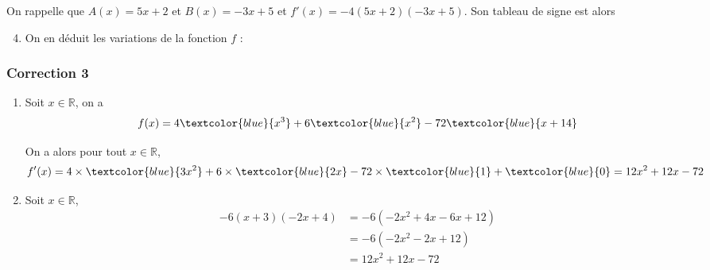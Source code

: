 \documentclass[15pt, mathserif]{beamer}
\newcommand{\R}{\mathbb{R}}			%
\begin{document}
\begin{frame}On rappelle que $A(x) = 5x+2$ et $B(x) = -3x+5$ et $f'(x) = -4(5x+2)(-3x+5)$. Son tableau de signe est alors 

\medskip \hfil
{}

 \begin{enumerate} 
 \setcounter{enumi}{3} 
 	 \item On en déduit les variations de la fonction $f$ : 

  \medskip \hfil
{}

 \end{enumerate} 
 
\end{frame}


\begin{frame}
\vspace{-10mm}
	\frametitle{Correction 3}
\begin{enumerate} 
 	 \item Soit $x \in \R$, on a $$f(x)=4\textcolor{blue}{x^3}+6\textcolor{blue}{x^2}-72\textcolor{blue}{x+14}$$
 
 On a alors pour tout $x \in  \R$, $$f'(x)= 4\times \textcolor{blue}{3x^2} +6\times \textcolor{blue}{2x}-72\times \textcolor{blue}{1}+\textcolor{blue}{0}=12x^2+12x-72$$
 	 \item Soit $x \in \R$, \begin{align*} 
 -6(x+3)(-2x+4) & = -6\left( -2x^2 +4x -6x +12\right) \\ 
 &=  -6\left( -2x^2 -2x +12\right) \\ 
 &= 12x^2 +12x -72
 \end{align*} \end{enumerate} 
 
 \end{frame} 
 
\end{document}
